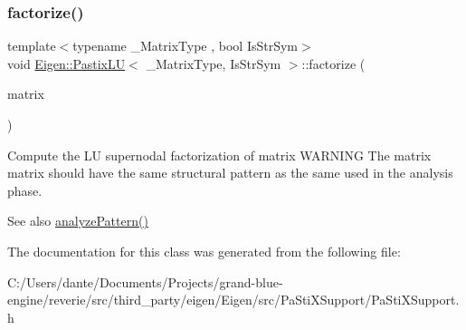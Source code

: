 \subsubsection{\texorpdfstring{factorize()}{factorize()}}
{\footnotesize\ttfamily template$<$typename \+\_\+\+Matrix\+Type , bool Is\+Str\+Sym$>$ \\
void \mbox{\hyperlink{class_eigen_1_1_pastix_l_u}{Eigen\+::\+Pastix\+LU}}$<$ \+\_\+\+Matrix\+Type, Is\+Str\+Sym $>$\+::factorize (\begin{DoxyParamCaption}\item[{const Matrix\+Type \&}]{matrix }\end{DoxyParamCaption})\hspace{0.3cm}{\ttfamily [inline]}}

Compute the LU supernodal factorization of {\ttfamily matrix} W\+A\+R\+N\+I\+NG The matrix {\ttfamily matrix} should have the same structural pattern as the same used in the analysis phase. \begin{DoxySeeAlso}{See also}
\mbox{\hyperlink{class_eigen_1_1_pastix_l_u_abae3ca7f1254106d9e2d5e0f273189fa}{analyze\+Pattern()}} 
\end{DoxySeeAlso}


The documentation for this class was generated from the following file\+:\begin{DoxyCompactItemize}
\item 
C\+:/\+Users/dante/\+Documents/\+Projects/grand-\/blue-\/engine/reverie/src/third\+\_\+party/eigen/\+Eigen/src/\+Pa\+Sti\+X\+Support/Pa\+Sti\+X\+Support.\+h\end{DoxyCompactItemize}
